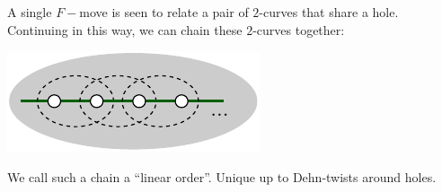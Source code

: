 \documentclass[aps, prl, letterpaper, twocolumn, superscriptaddress, notitlepage, 10pt]{revtex4-1}
\begin{document}


A single $F-$move is seen to relate a pair of $2$-curves
that share a hole.
Continuing in this way, we can chain these $2$-curves together:
\begin{center}
\includegraphics[]{pic-chain.pdf}
\end{center}

We call such a chain a ``linear order''.
Unique up to Dehn-twists around holes.
\end{document}
